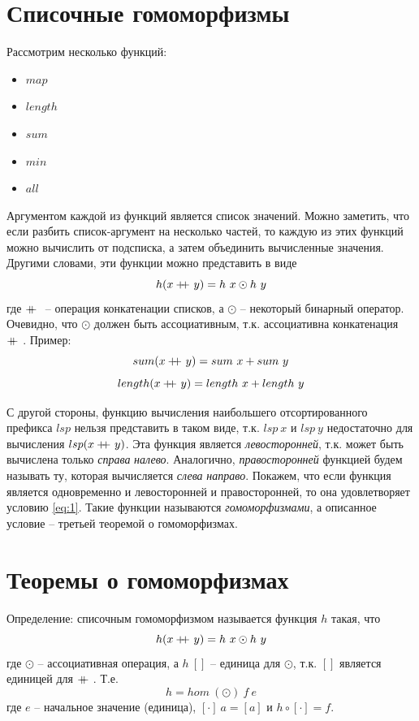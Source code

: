 \documentclass[a4paper,11pt]{article}
\newcommand\doubleplus{+\kern-1.3ex+\kern0.8ex}
\begin{document}
\section{Списочные гомоморфизмы}
Рассмотрим несколько функций:
\begin{itemize}
\item $map$
\item $length$
\item $sum$
\item $min$
\item $all$
\end{itemize}
Аргументом каждой из функций является список значений. Можно заметить, что
если разбить список-аргумент на несколько частей, то каждую из этих функций
можно вычислить от подсписка, а затем объединить вычисленные значения. Другими
словами, эти функции можно представить в виде
\begin{equation}
  h(x \doubleplus y) = h~x \odot h~y
  \label{eq:1}
\end{equation}
где $\doubleplus$ -- операция конкатенации списков, а $\odot$ -- некоторый
бинарный оператор. Очевидно, что $\odot$ должен быть ассоциативным, т.к.
ассоциативна конкатенация $\doubleplus$. Пример:
\begin{equation*}
  sum(x \doubleplus y) = sum~x + sum~y
\end{equation*}
\begin{equation*}
  length(x \doubleplus y) = length~x + length~y
\end{equation*}

С другой стороны, функцию вычисления наибольшего отсортированного префикса
$lsp$ нельзя представить в таком виде, т.к. $lsp~x$ и $lsp~y$ недостаточно
для вычисления $lsp(x \doubleplus y)$. Эта функция является 
\emph{левосторонней}, т.к. может быть вычислена только \emph{справа} 
\emph{налево}. Аналогично, \emph{правосторонней} функцией будем называть ту,
которая вычисляется \emph{слева} \emph{направо}. Покажем, что если функция
является одновременно и левосторонней и правосторонней, то она удовлетворяет
условию \ref{eq:1}. Такие функции называются \emph{гомоморфизмами}, а 
описанное условие -- третьей теоремой о гомоморфизмах.

\section{Теоремы о гомоморфизмах}
Определение: списочным гомоморфизмом называется функция $h$ такая, что
\begin{equation*}
  h(x \doubleplus y) = h~x \odot h~y
\end{equation*}
где $\odot$ -- ассоциативная операция, а $h~[]$ -- единица для 
$\odot$, т.к. $[]$ является единицей для $\doubleplus$. Т.е.
\begin{equation*}
  h = hom~(\odot)~f~e
\end{equation*}
где $e$ -- начальное значение (единица), $[\cdot]~a = [a]$ и
$h \circ [\cdot] = f$.
\end{document}
